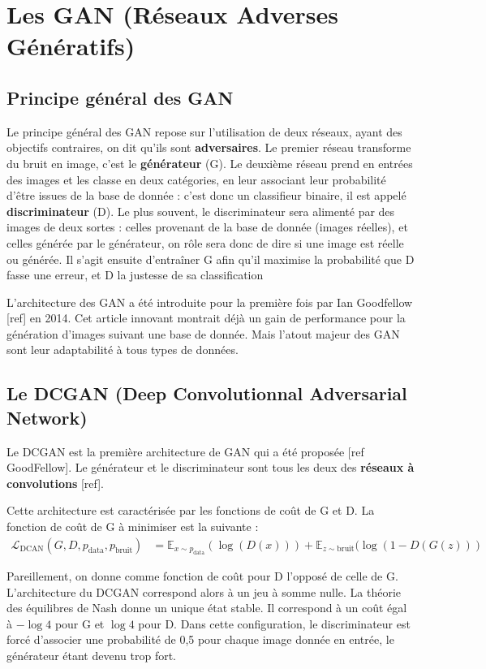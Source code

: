 \chapter{Les GAN (Réseaux Adverses Génératifs)}

\section{Principe général des GAN}
Le principe général des GAN repose sur l'utilisation de deux réseaux, ayant des objectifs contraires, on dit qu'ils sont \textbf{adversaires}. Le premier réseau transforme du bruit en image, c'est le \textbf{générateur} (G). Le deuxième réseau prend en entrées des images et les classe en deux catégories, en leur associant leur probabilité d'être issues de la base de donnée : c'est donc un classifieur binaire, il est appelé \textbf{discriminateur} (D). Le plus souvent, le discriminateur sera alimenté par des images de deux sortes : celles provenant de la base de donnée (images réelles), et celles générée par le générateur, on rôle sera donc de dire si une image est réelle ou générée. Il s'agit ensuite d'entraîner G afin qu'il maximise la probabilité que D fasse une erreur, et D la justesse de sa classification

L'architecture des GAN a été introduite pour la première fois par Ian Goodfellow [ref] en 2014. Cet article innovant montrait déjà un gain de performance pour la génération d'images suivant une base de donnée. Mais l'atout majeur des GAN sont leur adaptabilité à tous types de données.


\section{Le DCGAN (Deep Convolutionnal Adversarial Network)}
Le DCGAN est la première architecture de GAN qui a été proposée [ref GoodFellow]. Le générateur et le discriminateur sont tous les deux des \textbf{réseaux à convolutions} [ref].

Cette architecture est caractérisée par les fonctions de coût de G et D. La fonction de coût de G à minimiser est la suivante : $$\begin{aligned}
\mathcal{L}_{\mathrm{DCAN}}\left(G, D, p_{\mathrm{data}}, p_{\mathrm{bruit}}\right) &=
   \mathbb{E}_{x \sim p_{\mathrm{data}}}(\log (D(x))) + \mathbb{E}_{z \sim \mathrm{bruit}}(\log (1 - D(G(z)))
\end{aligned}$$

Pareillement, on donne comme fonction de coût pour D l'opposé de celle de G. L'architecture du DCGAN correspond alors à un jeu à somme nulle. La théorie des équilibres de Nash donne un unique état stable. Il correspond à un coût égal à $-\log 4$ pour G et $ \log 4$ pour D. Dans cette configuration, le discriminateur est forcé d'associer une probabilité de 0,5 pour chaque image donnée en entrée, le générateur étant devenu trop fort.

